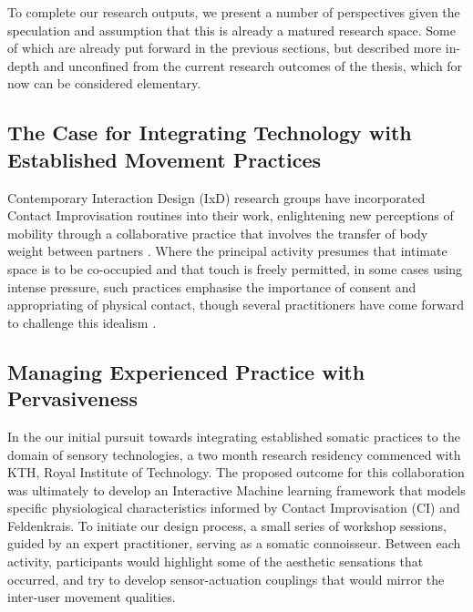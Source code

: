 To complete our research outputs, we present a number of perspectives given the speculation and assumption that this is already a matured research space. Some of which are already put forward in the previous sections, but described more in-depth and unconfined from the current research outcomes of the thesis, which for now can be considered elementary.

\subsection{The Case for Integrating Technology with Established Movement Practices}

Contemporary Interaction Design (IxD) research groups have incorporated Contact Improvisation routines into their work, enlightening new perceptions of mobility through a collaborative practice that involves the transfer of body weight between partners \cite{bomba_somacoustics_2019, barrero_gonzalez_dance_2019}. Where the principal activity presumes that intimate space is to be co-occupied and that touch is freely permitted, in some cases using intense pressure, such practices emphasise the importance of consent and appropriating of physical contact, though several practitioners have come forward to challenge this idealism \cite{tai_exploring_2017,beaulieux_how_2019}.

\subsection{Managing Experienced Practice with Pervasiveness}

In the our initial pursuit towards integrating established somatic practices to the domain of sensory technologies, a two month research residency commenced with KTH, Royal Institute of Technology. The proposed outcome for this collaboration was ultimately to develop an Interactive Machine learning framework that models specific physiological characteristics informed by Contact Improvisation (CI) and Feldenkrais. To initiate our design process, a small series of workshop sessions, guided by an expert practitioner, serving as a somatic connoisseur. Between each activity, participants would highlight some of the aesthetic sensations that occurred, and try to develop sensor-actuation couplings that would mirror the inter-user movement qualities.

